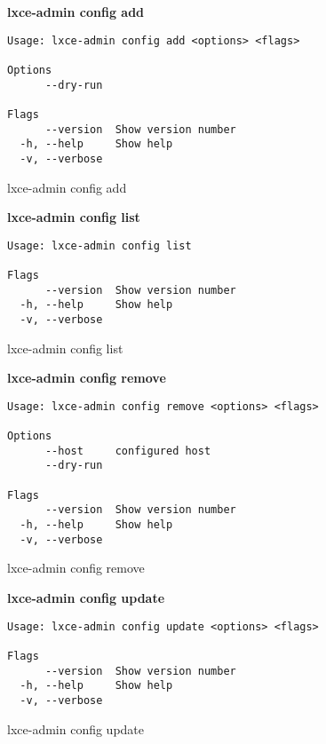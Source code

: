 \textbf{lxce-admin config add}
\begin{listing}[H]
\begin{verbatim}
Usage: lxce-admin config add <options> <flags>

Options
      --dry-run                                                        

Flags
      --version  Show version number                                   
  -h, --help     Show help                                             
  -v, --verbose
\end{verbatim}
\caption{lxce-admin config add}
\label{listings: lxce-admin config add}
\end{listing}

\textbf{lxce-admin config list}
\begin{listing}[H]
\begin{verbatim}
Usage: lxce-admin config list

Flags
      --version  Show version number                                   
  -h, --help     Show help                                             
  -v, --verbose
\end{verbatim}
\caption{lxce-admin config list}
\label{listings: lxce-admin config list}
\end{listing}

\textbf{lxce-admin config remove}
\begin{listing}[H]
\begin{verbatim}
Usage: lxce-admin config remove <options> <flags>

Options
      --host     configured host                             
      --dry-run                                              

Flags
      --version  Show version number                                   
  -h, --help     Show help                                             
  -v, --verbose
\end{verbatim}
\caption{lxce-admin config remove}
\label{listings: lxce-admin config remove}
\end{listing}

\textbf{lxce-admin config update}
\begin{listing}[H]
\begin{verbatim}
Usage: lxce-admin config update <options> <flags>

Flags
      --version  Show version number                                   
  -h, --help     Show help                                             
  -v, --verbose
\end{verbatim}
\caption{lxce-admin config update}
\label{listings: lxce-admin config update}
\end{listing}

